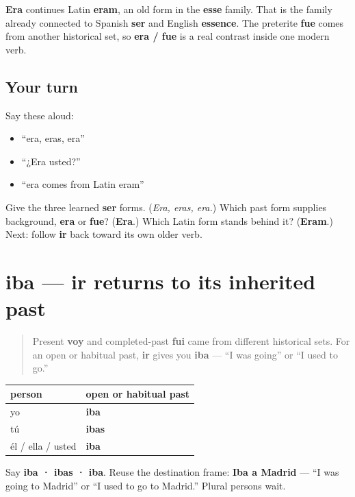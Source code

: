 \begin{cousinweb}
\textbf{Era} continues Latin \textbf{eram}, an old form in the \textbf{esse} family. That is the family already connected to Spanish \textbf{ser} and English \textbf{essence}. The preterite \textbf{fue} comes from another historical set, so \textbf{era / fue} is a real contrast inside one modern verb.
\end{cousinweb}

\subsection*{Your turn}
Say these aloud:

\begin{itemize}
\raggedright
  \item “era, eras, era”
  \item “¿Era usted?”
  \item “era comes from Latin eram”
\end{itemize}

\begin{tcolorbox}[breakable,colback=teal!4,colframe=teal!35!black,title={Before you move on}]
Give the three learned \textbf{ser} forms. (\emph{Era, eras, era.}) Which past form supplies background, \textbf{era} or \textbf{fue}? (\textbf{Era}.) Which Latin form stands behind it? (\textbf{Eram}.) Next: follow \textbf{ir} back toward its own older verb.
\end{tcolorbox}
\section[iba]{iba — ir returns to its inherited past}

\label{lesson:ES-C16-ir-imperfecto}



\begin{quote}
Present \textbf{voy} and completed-past \textbf{fui} came from different historical sets. For an open or habitual past, \textbf{ir} gives you \textbf{iba} — “I was going” or “I used to go.”
\end{quote}

\begin{grammarlens}[title={Grammar Lens: the singular ir row}]
\noindent
\begin{tabularx}{\linewidth}{@{}>{\raggedright\arraybackslash}X>{\raggedright\arraybackslash}X@{}}
\toprule
\textbf{person} & \textbf{open or habitual past} \\
\midrule
yo & \textbf{iba} \\
tú & \textbf{ibas} \\
él / ella / usted & \textbf{iba} \\
\bottomrule
\end{tabularx}

Say \textbf{iba · ibas · iba}. Reuse the destination frame: \textbf{Iba a Madrid} — “I was going to Madrid” or “I used to go to Madrid.” Plural persons wait.
\end{grammarlens}

